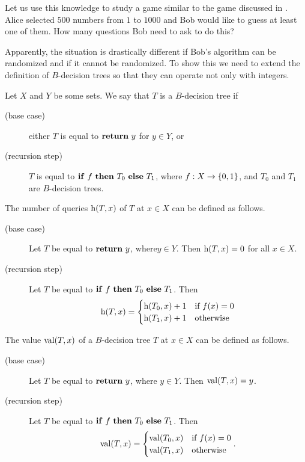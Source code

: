 Let us use this knowledge to study a game similar to the game discussed in
. Alice selected $500$ numbers from $1$ to
$1000$ and Bob would like to guess at least one of them. How many questions Bob
need to ask to do this?

Apparently, the situation is drastically different if Bob's algorithm can be
randomized and if it cannot be randomized. To show this we need to extend the
definition of $B$-decision trees so that they can operate not only with
integers.
\begin{definition}
  Let $X$ and $Y$ be some sets. We say that $T$ is a $B$-decision tree if
  \begin{description}
    \item [(base case)] either $T$ is equal to $\mathbf{return}~{y}$ for $y \in Y$, or
    \item [(recursion step)] $T$ is equal to $\mathbf{if}~{f}~\mathbf{then}~{T_0}~\mathbf{else}~{T_1}$,
      where $f : X \to \set{0, 1}$, and $T_0$ and $T_1$
      are $B$-decision trees.
  \end{description}

  The number of queries $\DTHeight[x]{T}$ of $T$ at $x \in X$ can be defined as
  follows.
  \begin{description}
    \item [(base case)] Let $T$ be equal to $\mathbf{return}~{y}$, where$y \in Y$. Then
      $\DTHeight[x]{T} = 0$ for all $x \in X$.
    \item[(recursion step)] Let $T$ be equal to $\mathbf{if}~{f}~\mathbf{then}~{T_0}~\mathbf{else}~{T_1}$. Then
      \[
          \DTHeight[x]{T} = 
          \begin{cases}
            \DTHeight[x]{T_0} + 1 & \text{if } f(x) = 0 \\
            \DTHeight[x]{T_1} + 1 & \text{otherwise}
          \end{cases}
      \]
  \end{description}

  The value $\mathrm{val}({T}, {x})$ of a $B$-decision tree $T$ at $x \in X$
  can be defined as follows.
  \begin{description}
      \item [(base case)] Let $T$ be equal to $\mathbf{return}~{y}$, where $y \in Y$.
        Then $\mathrm{val}({T}, {x}) = y$.
      \item[(recursion step)] Let $T$ be equal to $\mathbf{if}~{f}~\mathbf{then}~{T_0}~\mathbf{else}~{T_1}$. Then
        \[
          \mathrm{val}({T}, {x}) =
          \begin{cases} 
            \mathrm{val}({T_0}, {x}) & \text{if } f(x) = 0 \\
            \mathrm{val}({T_1}, {x}) & \text{otherwise}
          \end{cases}.
        \]
  \end{description}
\end{definition}


